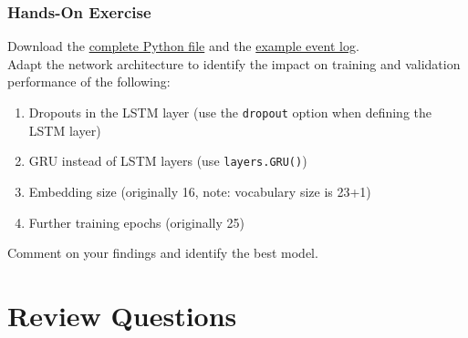 
\begin{tcolorbox}[colback=code]
\subsubsection*{Hands-On Exercise} 

Download the \href{https://github.com/jevermann/busi4720-ml/blob/main/process_prediction.py}{complete Python file} and the \href{https://evermann.ca/busi4720/BPI_Challenge_2012.xes.gz}{example event log}. \\

Adapt the network architecture to identify the impact on training and validation performance of the following:
   \begin{enumerate}
      \item Dropouts in the LSTM layer (use the \texttt{dropout} option when defining the LSTM layer)
      \item GRU instead of LSTM layers (use \texttt{layers.GRU()})
      \item Embedding size (originally 16, note: vocabulary size is 23+1)
      \item Further training epochs (originally 25)
   \end{enumerate}
Comment on your findings and identify the best model. \\
\end{tcolorbox}

\section{Review Questions}
